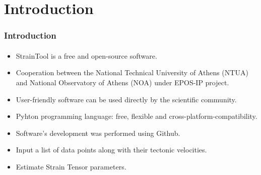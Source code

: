 \section{Introduction}
 

\begin{frame}
  \frametitle{Introduction}
  \framesubtitle{}
  \label{ch1:intro}
  
  \begin{itemize}
    \item StrainTool is a free and open-source software.
    
    \item Cooperation between the National Technical University of Athens (NTUA) and National Observatory of Athens (NOA) under EPOS-IP project.
    
    \item User-friendly software can be used directly by the scientific community.
    
    \item Pyhton programming language: free, flexible and cross-platform-compatibility.
    
    \item Software's development was performed using Github.
    
    \item Input a list of data points along with their tectonic velocities.
    
    \item Estimate Strain Tensor parameters.
  \end{itemize}
  
  
\end{frame}
\note{}





